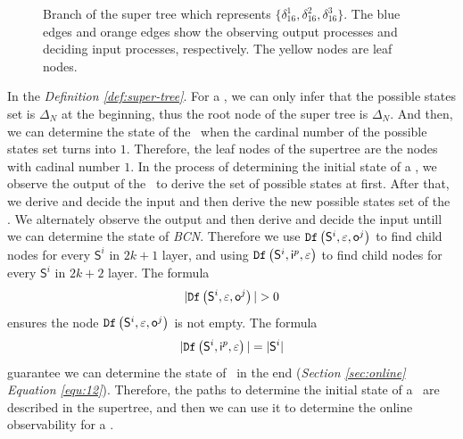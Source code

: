   \begin{figure}[thpb]
      \centering
      
      \caption{Branch of the super tree which represents $\{\delta_{16}^1,\delta_{16}^2,\delta_{16}^3\}$. The blue edges and orange edges show the observing output processes and deciding input processes, respectively. The yellow nodes are leaf nodes.}
      \label{fig:3}
   \end{figure}

In the {\em Definition \ref{def:super-tree}}. For a \BCN, we can only infer that the possible states set is $\Delta_N$ at the beginning, thus the root node of the super tree is $\Delta_N$. And then,  we can determine the state of the \BCN\ when the cardinal number of the possible states set turns into $1$. Therefore, the leaf nodes of the supertree are the nodes with cadinal number $1$. In the process of determining the initial state of a \BCN, we observe the output of the \BCN\ to derive the set of possible states at first. After that, we derive and decide the input and then derive the new possible states set of the \BCN. We alternately observe the output and then derive and decide the input untill we can determine the state of {\em BCN}. Therefore we use ${\tt Df}\left(\mathsf{S}^i,\varepsilon, \mathsf{o}^j\right)$ to find child nodes for every $\mathsf{S}^i$ in $2k+1$ layer, and using ${\tt Df}\left(\mathsf{S}^i,\mathsf{i}^p,\varepsilon\right)$ to find child nodes for every $\mathsf{S}^i$ in $2k+2$ layer. The formula 
\[|\Ded\left(\mathsf{S}^i,\varepsilon, \mathsf{o}^j\right)|>0\]
 ensures the node ${\tt Df}\left(\mathsf{S}^i,\varepsilon, \mathsf{o}^j\right)$ is not empty. The formula 
 \[|{\tt Df}\left(\mathsf{S}^i,\mathsf{i}^p,\varepsilon\right)|=|\mathsf{S}^i|\] 
 guarantee we can determine the state of \BCN\ in the end ({\em Section \ref{sec:online}} {\em Equation \ref{equ:12}}). Therefore, the paths to determine the initial state of a \BCN\ are described in the supertree, and then we can use it to determine the online observability for a \BCN.


